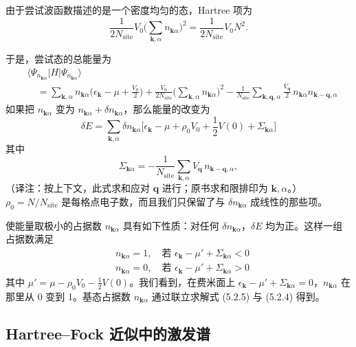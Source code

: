 由于尝试波函数描述的是一个密度均匀的态，Hartree 项为
\begin{equation*}
\frac{1}{2N_{\mathrm{site}}} V_0 \Big( \sum_{\pmb{k},\alpha} n_{\pmb{k}\alpha} \Big)^{2} = \frac{1}{2N_{\mathrm{site}}} V_0 N^{2}.
\end{equation*}

于是，尝试态的总能量为
\begin{align*}
&\langle \Psi_{n_{\pmb{k}\alpha}} | H | \Psi_{n_{\pmb{k}\alpha}} \rangle \tag{5.2.2}\\
&\quad = \sum_{\pmb{k},\alpha} n_{\pmb{k}\alpha} \Big( \epsilon_{\pmb{k}} - \mu + \frac{V_0}{2} \Big) + \frac{V_0}{2N_{\mathrm{site}}} \Big( \sum_{\pmb{k},\alpha} n_{\pmb{k}\alpha} \Big)^{2} - \frac{1}{N_{\mathrm{site}}} \sum_{\pmb{k},\pmb{q},\alpha} \frac{V_{\pmb{q}}}{2}\, n_{\pmb{k}\alpha} n_{\pmb{k}-\pmb{q},\alpha}
\end{align*}
如果把 $n_{\pmb{k}\alpha}$ 变为 $n_{\pmb{k}\alpha}+\delta n_{\pmb{k}\alpha}$，那么能量的改变为
\begin{equation*}
\delta E = \sum_{\pmb{k},\alpha} \delta n_{\pmb{k}\alpha} \Big[ \epsilon_{\pmb{k}} - \mu + \rho_0 V_0 + \frac{1}{2} V(0) + \Sigma_{\pmb{k}\alpha} \Big] \tag{5.2.3}
\end{equation*}
其中
\begin{equation*}
\Sigma_{\pmb{k}\alpha} = -\frac{1}{N_{\mathrm{site}}} \sum_{\pmb{k},\alpha} V_{\pmb{q}}\, n_{\pmb{k}-\pmb{q},\alpha}, \tag{5.2.4}
\end{equation*}
（译注：按上下文，此式求和应对 $\pmb{q}$ 进行；原书求和限排印为 $\pmb{k},\alpha$。）
$\rho_0 = N/N_{\mathrm{site}}$ 是每格点电子数，而且我们只保留了与 $\delta n_{\pmb{k}\alpha}$ 成线性的那些项。

使能量取极小的占据数 $n_{\pmb{k}\alpha}$ 具有如下性质：对任何 $\delta n_{\pmb{k}\alpha}$，$\delta E$ 均为正。这样一组占据数满足
\begin{align*}
&n_{\pmb{k}\alpha} = 1, \quad \text{若 } \epsilon_{\pmb{k}} - \mu' + \Sigma_{\pmb{k}\alpha} < 0\\
&n_{\pmb{k}\alpha} = 0, \quad \text{若 } \epsilon_{\pmb{k}} - \mu' + \Sigma_{\pmb{k}\alpha} > 0 \tag{5.2.5}
\end{align*}
其中 $\mu' = \mu - \rho_0 V_0 - \frac{1}{2}V(0)$。我们看到，在费米面上 $\epsilon_{\pmb{k}} - \mu' + \Sigma_{\pmb{k}\alpha} = 0$，$n_{\pmb{k}\alpha}$ 在那里从 0 变到 1。基态占据数 $n_{\pmb{k}\alpha}$ 通过联立求解式 (5.2.5) 与 (5.2.4) 得到。

\subsection{Hartree--Fock 近似中的激发谱}

